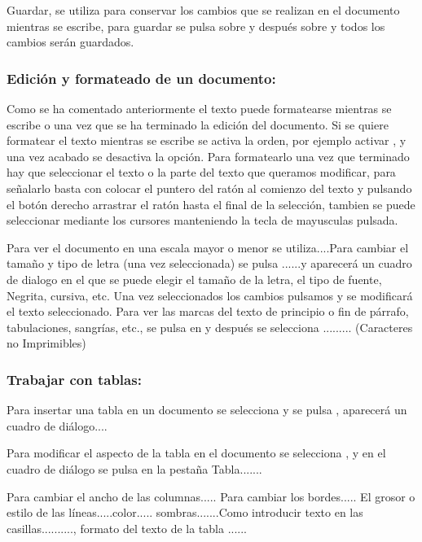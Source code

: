 Guardar, se utiliza para conservar los cambios que se realizan en el documento
mientras se escribe, para guardar se pulsa sobre  y después sobre
 y todos los cambios serán guardados.



\subsubsection{Edición y formateado de un documento:}

Como se ha comentado anteriormente el texto puede formatearse mientras se escribe
o una vez que se ha terminado la edición del documento. Si se quiere formatear
el texto mientras se escribe se activa la orden, por ejemplo activar ,
y una vez acabado se desactiva la opción. Para formatearlo una vez que terminado
hay que seleccionar el texto o la parte del texto que queramos modificar, para
señalarlo basta con colocar el puntero del ratón al comienzo del texto y pulsando
el botón derecho arrastrar el ratón hasta el final de la selección, tambien
se puede seleccionar mediante los cursores manteniendo la tecla de mayusculas
pulsada.

Para ver el documento en una escala mayor o menor se utiliza....Para cambiar
el tamaño y tipo de letra (una vez seleccionada) se pulsa ......y
aparecerá un cuadro de dialogo en el que se puede elegir el tamaño de la letra,
el tipo de fuente, Negrita, cursiva, etc. Una vez seleccionados los cambios
pulsamos  y se modificará el texto seleccionado. Para ver las marcas
del texto de principio o fin de párrafo, tabulaciones, sangrías, etc., se pulsa
en  y después se selecciona ......... (Caracteres no Imprimibles)


\subsubsection{Trabajar con tablas:}

Para insertar una tabla en un documento se selecciona  y se pulsa
, aparecerá un cuadro de diálogo.... 

Para modificar el aspecto de la tabla en el documento se selecciona ,
 y en el cuadro de diálogo se pulsa en la pestaña Tabla.......


Para cambiar el ancho de las columnas..... Para cambiar los bordes..... El grosor
o estilo de las líneas.....color..... sombras.......Como introducir texto en
las casillas.........., formato del texto de la tabla ......


